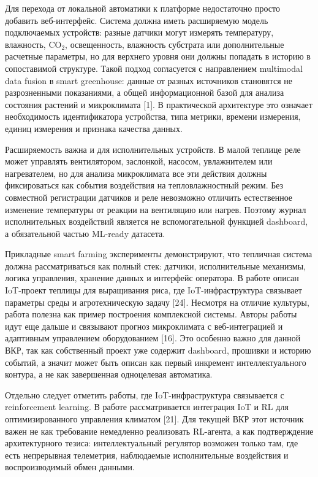 \documentclass[a4paper,14pt]{extarticle}
\begin{document}
Для перехода от локальной автоматики к платформе недостаточно просто
добавить веб-интерфейс. Система должна иметь расширяемую модель
подключаемых устройств: разные датчики могут измерять температуру,
влажность, CO\(_2\), освещенность, влажность субстрата или
дополнительные расчетные параметры, но для верхнего уровня они должны
попадать в историю в сопоставимой структуре. Такой подход согласуется с
направлением multimodal data fusion в smart greenhouse: данные от разных
источников становятся не разрозненными показаниями, а общей
информационной базой для анализа состояния растений и микроклимата
{[}1{]}. В практической архитектуре это означает необходимость
идентификатора устройства, типа метрики, времени измерения, единиц
измерения и признака качества данных.

Расширяемость важна и для исполнительных устройств. В малой теплице реле
может управлять вентилятором, заслонкой, насосом, увлажнителем или
нагревателем, но для анализа микроклимата все эти действия должны
фиксироваться как события воздействия на тепловлажностный режим. Без
совместной регистрации датчиков и реле невозможно отличить естественное
изменение температуры от реакции на вентиляцию или нагрев. Поэтому
журнал исполнительных воздействий является не вспомогательной функцией
dashboard, а обязательной частью ML-ready датасета.

Прикладные smart farming эксперименты демонстрируют, что тепличная
система должна рассматриваться как полный стек: датчики, исполнительные
механизмы, логика управления, хранение данных и интерфейс оператора. В
работе описан IoT-проект теплицы для выращивания риса, где
IoT-инфраструктура связывает параметры среды и агротехническую задачу
{[}24{]}. Несмотря на отличие культуры, работа полезна как пример
построения комплексной системы. Авторы работы идут еще дальше и
связывают прогноз микроклимата с веб-интеграцией и адаптивным
управлением оборудованием {[}16{]}. Это особенно важно для данной ВКР,
так как собственный проект уже содержит dashboard, прошивки и историю
событий, а значит может быть описан как первый инкремент
интеллектуального контура, а не как завершенная одноцелевая автоматика.

Отдельно следует отметить работы, где IoT-инфраструктура связывается с
reinforcement learning. В работе рассматривается интеграция IoT и RL для
оптимизированного управления климатом {[}21{]}. Для текущей ВКР этот
источник важен не как требование немедленно реализовать RL-агента, а как
подтверждение архитектурного тезиса: интеллектуальный регулятор возможен
только там, где есть непрерывная телеметрия, наблюдаемые исполнительные
воздействия и воспроизводимый обмен данными.
\end{document}
